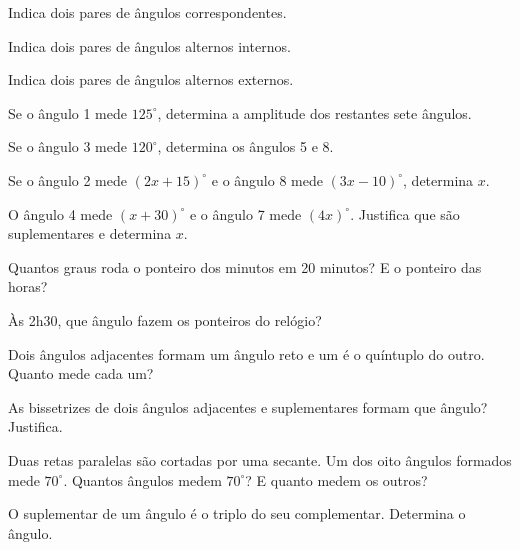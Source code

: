 \documentclass[12pt]{article}
\begin{document}

\begin{center}
\end{center}

\begin{exercicios}
  \item Indica dois pares de ângulos correspondentes.
  \item Indica dois pares de ângulos alternos internos.
  \item Indica dois pares de ângulos alternos externos.
  \item Se o ângulo 1 mede $125^\circ$, determina a amplitude dos restantes sete ângulos.
  \item Se o ângulo 3 mede $120^\circ$, determina os ângulos 5 e 8.
  \item Se o ângulo 2 mede $(2x + 15)^\circ$ e o ângulo 8 mede $(3x - 10)^\circ$, determina $x$.
  \item O ângulo 4 mede $(x + 30)^\circ$ e o ângulo 7 mede $(4x)^\circ$. Justifica que são suplementares e determina $x$.
\end{exercicios}

\begin{exercicios}
  \item Quantos graus roda o ponteiro dos minutos em 20 minutos? E o ponteiro das horas?
  \item Às 2h30, que ângulo fazem os ponteiros do relógio?
  \item Dois ângulos adjacentes formam um ângulo reto e um é o quíntuplo do outro. Quanto mede cada um?
  \item As bissetrizes de dois ângulos adjacentes e suplementares formam que ângulo? Justifica.
  \item Duas retas paralelas são cortadas por uma secante. Um dos oito ângulos formados mede $70^\circ$. Quantos ângulos medem $70^\circ$? E quanto medem os outros?
  \item O suplementar de um ângulo é o triplo do seu complementar. Determina o ângulo.
\end{exercicios}
\end{document}
